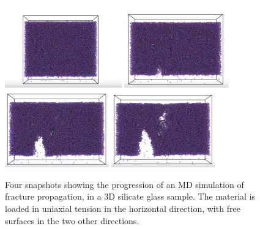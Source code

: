 
\begin{figure}
    \centering
    \noindent
\includegraphics[width=0.45\textwidth]{picture/frac_prop1.PNG}\hspace{0.15\textwidth}%
\includegraphics[width=0.4\textwidth]{picture/frac_prop2.PNG}\\[2em]
\includegraphics[width=0.4\textwidth]{picture/frac_prop3.PNG}\hspace{0.2\textwidth}%
\includegraphics[width=0.4\textwidth]{picture/frac_prop4.PNG}\par
    \caption{Four snapshots showing the progression of an MD simulation of fracture propagation, in a 3D silicate glass sample. The material is loaded in uniaxial tension in the horizontal direction, with free surfaces in the two other directions.}
    \label{fig:crack_prop}
\end{figure}

